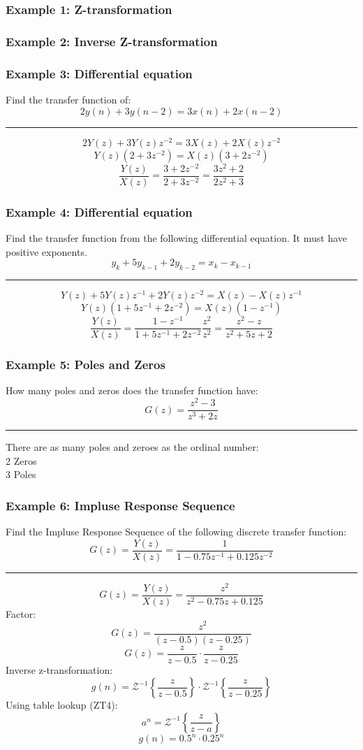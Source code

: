 \subsubsection{Example 1: Z-transformation}
\subsubsection{Example 2: Inverse Z-transformation}
\subsubsection{Example 3: Differential equation}
Find the transfer function of:
$$2y(n)+3y(n-2)=3x(n)+2x(n-2)$$

\rule{\textwidth}{0.5pt}

$$2Y(z)+3Y(z)z^{-2}=3X(z)+2X(z)z^{-2}$$
$$Y(z)(2+3z^{-2})=X(z)(3+2z^{-2})$$
$$\frac{Y(z)}{X(z)}=\frac{3+2z^{-2}}{2+3z^{-2}}=\frac{3z^2+2}{2z^2+3}$$
\subsubsection{Example 4: Differential equation}
Find the transfer function from the following differential equation. It must have positive exponents.
$$y_k+5y_{k-1}+2y_{k-2}=x_k-x_{k-1}$$

\rule{\textwidth}{0.5pt}

$$Y(z)+5Y(z)z^{-1}+2Y(z)z^{-2}=X(z)-X(z)z^{-1}$$
$$Y(z)(1+5z^{-1}+2z^{-2})=X(z)(1-z^{-1})$$
$$\frac{Y(z)}{X(z)}=\frac{1-z^{-1}}{1+5z^{-1}+2z^{-2}}\frac{z^2}{z^2}=\frac{z^2-z}{z^2+5z+2}$$

\subsubsection{Example 5: Poles and Zeros}
How many poles and zeros does the transfer function have:
$$G(z)=\frac{z^2-3}{z^3+2z}$$

\rule{\textwidth}{0.5pt}

There are as many poles and zeroes as the ordinal number:\\
2 Zeros\\
3 Poles

\subsubsection{Example 6: Impluse Response Sequence}
Find the Impluse Response Sequence of the following discrete transfer function:
$$G(z)=\frac{Y(z)}{X(z)}=\frac{1}{1-0.75z^{-1}+0.125z^{-2}}$$

\rule{\textwidth}{0.5pt}

$$G(z)=\frac{Y(z)}{X(z)}=\frac{z^2}{z^2-0.75z+0.125}$$
Factor:
$$G(z)=\frac{z^2}{(z-0.5)(z-0.25)}$$
$$G(z)=\frac{z}{z-0.5}\cdot\frac{z}{z-0.25}$$
Inverse z-transformation:
$$g(n)=\mathcal{Z}^{-1}\left\{\frac{z}{z-0.5}\right\}\cdot\mathcal{Z}^{-1}\left\{\frac{z}{z-0.25}\right\}$$
Using table lookup (ZT4):
$$a^n=\mathcal{Z}^{-1}\left\{\frac{z}{z-a}\right\}$$
$$g(n)=0.5^n\cdot 0.25^n$$
